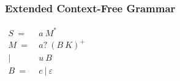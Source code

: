 \documentclass{beamer}
\begin{document}
	\begin{frame} 
		\frametitle{Extended Context-Free Grammar}
		\begin{center}
			{$\begin{aligned}
				S\ =&\ a\ M^* \\
				M\ =&\ a?\ (B\ K)^+ \\
				|&\ u\ B \\
				B\ =&\ c\ |\ \varepsilon
				\end{aligned}$}
		\end{center}
		
		

	\end{frame}
	
\end{document}
